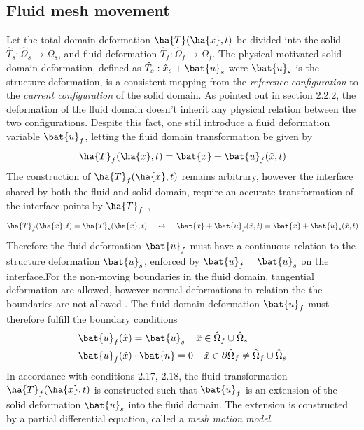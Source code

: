 \subsection{Fluid mesh movement}
 Let the total domain deformation $\ha{T}(\ha{x}, t)$ be divided into the solid  $\hat{T}_s: \hat{\Omega}_s \rightarrow \Omega_s$, and fluid deformation $\hat{T}_f: \hat{\Omega}_f \rightarrow \Omega_f$. The physical motivated solid domain deformation, defined as $\hat{T}_s: \hat{x}_s + \bat{u}_s$ were $\bat{u}_s$ is the structure deformation, is 
a consistent mapping from the \textit{reference configuration} to the \textit{current configuration} of the solid domain. As pointed out in section 2.2.2, the deformation of the fluid domain doesn't inherit any physical relation between the two configurations. Despite this fact, one still introduce a fluid deformation variable $\bat{u}_f$, letting the fluid domain transformation be given by 
\begin{align*}
\ha{T}_f(\ha{x}, t) = \bat{x} + \bat{u}_f(\hat{x}, t)
\end{align*}
The construction of $\ha{T}_f(\ha{x}, t) $ remains arbitrary, however the interface shared by both the fluid and solid domain, require an accurate transformation of the interface points by $\ha{T}_f$ \cite{Richter2016}, 
\begin{align*}
\ha{T}_f(\ha{x}, t) = \ha{T}_s(\ha{x}, t) \hspace{4mm}  \leftrightarrow  
\hspace{4mm}\bat{x} + \bat{u}_f(\hat{x}, t) =  \bat{x} + \bat{u}_s(\hat{x}, t)
\end{align*}
Therefore the fluid deformation $\bat{u}_f$ must have a continuous relation to the structure deformation $\bat{u}_s$, enforced by $\bat{u}_f = \bat{u}_s$ on the interface.For the non-moving boundaries in the fluid domain, tangential deformation are allowed, however normal deformations in relation the the boundaries are not allowed \cite{Richter2010c}. The fluid domain deformation $\bat{u}_f$ must therefore fulfill the boundary conditions 
\begin{align}
&\bat{u}_f(\hat{x}) = \bat{u}_s \hspace{4mm} \hat{x} \in \hat{\Omega}_f \cup  \hat{\Omega}_s \\
&\bat{u}_f(\hat{x}) \cdot \bat{n} = 0  \hspace{4mm}  \hat{x} \in \partial \hat{\Omega}_f \neq \hat{\Omega}_f \cup  \hat{\Omega}_s
\end{align} 
In accordance with conditions 2.17, 2.18, the fluid transformation $\ha{T}_f(\ha{x}, t) $ is constructed such that $\bat{u}_f$ is an extension of the solid deformation $\bat{u}_s$ into the fluid domain. The extension is constructed by a partial differential equation, called a \textit{mesh motion model}. 

